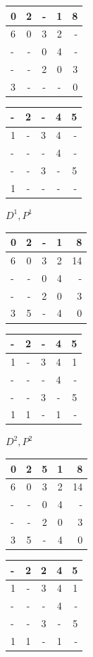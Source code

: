 \documentclass[a4paper,12pt]{article}
\begin{document}
\begin{tabular}{ | l | c | c | c | r | }
  \hline
  0 & 2 & - & 1 & 8 \\ \hline
  6 & 0 & 3 & 2 & - \\ \hline
  - & - & 0 & 4 & - \\ \hline
  - & - & 2 & 0 & 3 \\ \hline
  3 & - & - & - & 0 \\ \hline
\end{tabular}
\quad
\begin{tabular}{ | l | c | c | c | r | }
  \hline
  - & 2 & - & 4 & 5 \\ \hline
  1 & - & 3 & 4 & - \\ \hline
  - & - & - & 4 & - \\ \hline
  - & - & 3 & - & 5 \\ \hline
  1 & - & - & - & - \\ \hline
\end{tabular}

$D^1, P^1$

\begin{tabular}{ | l | c | c | c | r | }
  \hline
  0 & 2 & - & 1 & 8 \\ \hline
  6 & 0 & 3 & 2 & 14 \\ \hline
  - & - & 0 & 4 & - \\ \hline
  - & - & 2 & 0 & 3 \\ \hline
  3 & 5 & - & 4 & 0 \\ \hline
\end{tabular}
\quad
\begin{tabular}{ | l | c | c | c | r | }
  \hline
  - & 2 & - & 4 & 5 \\ \hline
  1 & - & 3 & 4 & 1 \\ \hline
  - & - & - & 4 & - \\ \hline
  - & - & 3 & - & 5 \\ \hline
  1 & 1 & - & 1 & - \\ \hline
\end{tabular}

$D^2, P^2$

\begin{tabular}{ | l | c | c | c | r | }
  \hline
  0 & 2 & 5 & 1 & 8 \\ \hline
  6 & 0 & 3 & 2 & 14 \\ \hline
  - & - & 0 & 4 & - \\ \hline
  - & - & 2 & 0 & 3 \\ \hline
  3 & 5 & - & 4 & 0 \\ \hline
\end{tabular}
\quad
\begin{tabular}{ | l | c | c | c | r | }
  \hline
  - & 2 & 2 & 4 & 5 \\ \hline
  1 & - & 3 & 4 & 1 \\ \hline
  - & - & - & 4 & - \\ \hline
  - & - & 3 & - & 5 \\ \hline
  1 & 1 & - & 1 & - \\ \hline
\end{tabular}
\end{document}
